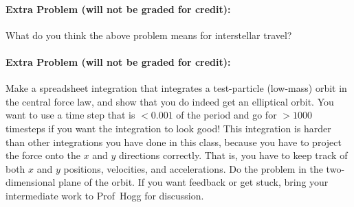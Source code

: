 \documentclass[12pt]{article}
\begin{document}
\paragraph{Extra Problem (will not be graded for credit):}%
What do you think the above problem means for interstellar travel?

\paragraph{Extra Problem (will not be graded for credit):}%
Make a spreadsheet integration that integrates a test-particle
(low-mass) orbit in the central force law, and show that you do indeed
get an elliptical orbit. You want to use a time step that is $<0.001$
of the period and go for $>1000$ timesteps if you want the integration
to look good! This integration is harder than other integrations you
have done in this class, because you have to project the force onto
the $x$ and $y$ directions correctly. That is, you have to keep track
of both $x$ and $y$ positions, velocities, and accelerations. Do the
problem in the two-dimensional plane of the orbit. If you want
feedback or get stuck, bring your intermediate work to Prof~Hogg for
discussion.
\end{document}
